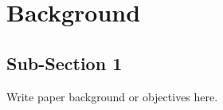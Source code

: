 \section{Background}
\label{sec:back}

\subsection{Sub-Section 1}
\label{subsec:back_one}

Write paper background or objectives here.

